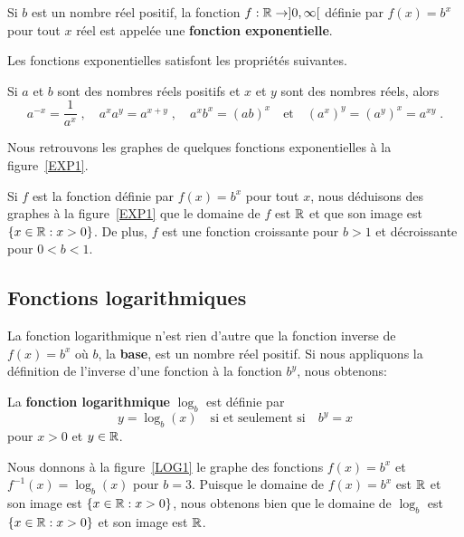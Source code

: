 {\begin{focus}{\dfn} 
Si $b$ est un nombre réel positif, la fonction
$f:\mathbb{R}\rightarrow ]0,\infty[$ définie par $f(x) = b^x$ pour tout $x$
réel est appelée une {\bfseries fonction exponentielle}.
\end{focus}

Les fonctions exponentielles satisfont les propriétés suivantes.

\begin{focus}{\prp}
Si $a$ et $b$ sont des nombres réels positifs et $x$ et $y$ sont des
nombres réels, alors
\[
a^{-x} = \frac{1}{a^x} \; , \quad a^x a^y = a^{x+y} \; ,
\quad a^x b^x = (ab)^x \quad \text{et} \quad
\left(a^x\right)^y = \left(a^y\right)^x = a^{xy} \; .
\]
\end{focus}

Nous retrouvons les graphes de quelques fonctions exponentielles à la
figure~\ref{EXP1}.

Si $f$ est la fonction définie par $f(x) = b^x$ pour tout $x$, nous
déduisons des graphes à la figure~\ref{EXP1} que le domaine de $f$ est
$\mathbb{R}$ et que son image est $\{ x \in \mathbb{R} : x > 0 \}$.  De plus, $f$
est une fonction croissante pour $b>1$ et décroissante pour $0<b<1$.

\subsection{Fonctions logarithmiques}

La fonction logarithmique n'est rien d'autre que la fonction inverse
de $f(x) = b^x$ où $b$, la {\bfseries base}, est un nombre réel
positif.  Si nous appliquons la définition de l'inverse d'une fonction à
la fonction $b^y$, nous obtenons:

\begin{focus}{\dfn} 
La {\bfseries fonction logarithmique} $\log_b$ est définie par
\[
y = \log_b(x)  \quad \text{si et seulement si} \quad  b^y = x
\]
pour $x>0$ et $y\in\mathbb{R}$.
\end{focus}

Nous donnons à la figure~\ref{LOG1} le graphe des fonctions $f(x) = b^x$
et $f^{-1}(x) = \log_b(x)$ pour $b=3$.  Puisque le domaine de
$f(x) = b^x$ est $\mathbb{R}$ et son image est $\{ x \in \mathbb{R} : x > 0 \}$, nous
obtenons bien que le domaine de $\log_b$ est $\{ x \in \mathbb{R} : x > 0 \}$
et son image est $\mathbb{R}$.

}
